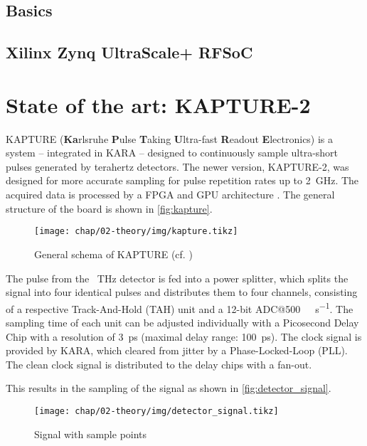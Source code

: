 \subsection{Basics}
\subsection{Xilinx Zynq UltraScale+ RFSoC}


\newpage
\section{State of the art: KAPTURE-2}
KAPTURE (\textbf{Ka}rlsruhe \textbf{P}ulse \textbf{T}aking \textbf{U}ltra-fast \textbf{R}eadout \textbf{E}lectronics) is a system -- integrated in KARA -- designed to continuously sample ultra-short pulses generated by terahertz detectors. The newer version, KAPTURE-2, was designed for more accurate sampling for pulse repetition rates up to \SI{2}{\giga \hertz}. The acquired data is processed by a FPGA and GPU architecture \cite{caselleKAP}.
The general structure of the board is shown in \autoref{fig:kapture}.

\begin{figure}[H]
	\centering
	\texttt{[image: chap/02-theory/img/kapture.tikz]}
	\caption{General schema of KAPTURE (cf. \cite[p.2]{caselleKAP})}
	\label{fig:kapture}
\end{figure}

The pulse from the \SI{}{\tera \hertz} detector is fed into a power splitter, which splits the signal into four identical pulses and distributes them to four channels, consisting of a respective Track-And-Hold (TAH) unit and a 12-bit ADC@\SI{500}{\mega\sample\per\second}. The sampling time of each unit can be adjusted individually with a Picosecond Delay Chip with a resolution of \SI{3}{\pico \second} (maximal delay range: \SI{100}{\pico \second}). 
The clock signal is provided by KARA, which cleared from jitter by a Phase-Locked-Loop (PLL). The clean clock signal is distributed to the delay chips with a fan-out. \cite{caselleKAP}

This results in the sampling of the signal as shown in \autoref{fig:detector_signal}.
\begin{figure}[H]
	\centering
	\texttt{[image: chap/02-theory/img/detector\_signal.tikz]}
	\caption{Signal with sample points}
	\label{fig:detector_signal}
\end{figure}


